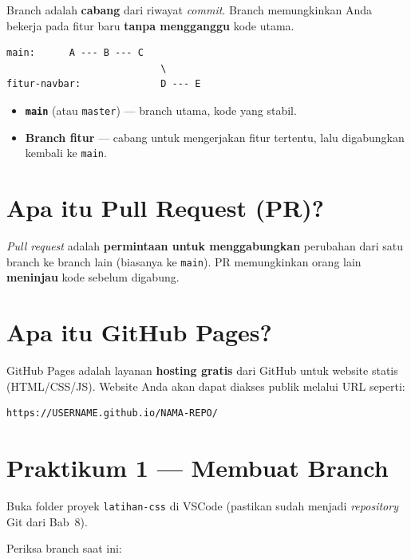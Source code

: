 Branch adalah \textbf{cabang} dari riwayat \emph{commit}. Branch memungkinkan Anda bekerja pada fitur baru \textbf{tanpa mengganggu} kode utama.

\begin{lstlisting}[caption={Ilustrasi branch}, label={lst:branch-illust}]
main:      A --- B --- C
                           \
fitur-navbar:              D --- E
\end{lstlisting}

\begin{itemize}
  \item \textbf{\texttt{main}} (atau \texttt{master}) --- branch utama, kode yang stabil.
  \item \textbf{Branch fitur} --- cabang untuk mengerjakan fitur tertentu, lalu digabungkan kembali ke \texttt{main}.
\end{itemize}

\section{Apa itu Pull Request (PR)?}
\label{sec:apa-itu-pr}

\emph{Pull request} adalah \textbf{permintaan untuk menggabungkan} perubahan dari satu branch ke branch lain (biasanya ke \texttt{main}). PR memungkinkan orang lain \textbf{meninjau} kode sebelum digabung.

\section{Apa itu GitHub Pages?}
\label{sec:apa-itu-pages}

GitHub Pages adalah layanan \textbf{hosting gratis} dari GitHub untuk website statis (HTML/CSS/JS). Website Anda akan dapat diakses publik melalui URL seperti:

\begin{lstlisting}[caption={Format URL GitHub Pages}, label={lst:url-pages}]
https://USERNAME.github.io/NAMA-REPO/
\end{lstlisting}

\section{Praktikum 1 --- Membuat Branch}
\label{sec:praktik-branch-1}

\begin{langkah}
  \item Buka folder proyek \texttt{latihan-css} di VSCode (pastikan sudah menjadi \emph{repository} Git dari Bab~8).
  \item Periksa branch saat ini:
\end{langkah}


